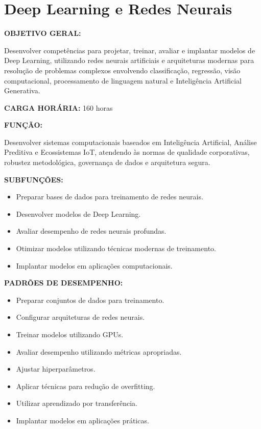 \section{Deep Learning e Redes Neurais}

\textbf{OBJETIVO GERAL:}

Desenvolver competências para projetar, treinar, avaliar e implantar modelos de Deep Learning, utilizando redes neurais artificiais e arquiteturas modernas para resolução de problemas complexos envolvendo classificação, regressão, visão computacional, processamento de linguagem natural e Inteligência Artificial Generativa.

\textbf{CARGA HORÁRIA:} 160 horas

\textbf{FUNÇÃO:}

Desenvolver sistemas computacionais baseados em Inteligência Artificial, Análise Preditiva e Ecossistemas IoT, atendendo às normas de qualidade corporativas, robustez metodológica, governança de dados e arquitetura segura.

\textbf{SUBFUNÇÕES:}

\begin{itemize}
\item Preparar bases de dados para treinamento de redes neurais.
\item Desenvolver modelos de Deep Learning.
\item Avaliar desempenho de redes neurais profundas.
\item Otimizar modelos utilizando técnicas modernas de treinamento.
\item Implantar modelos em aplicações computacionais.
\end{itemize}

\textbf{PADRÕES DE DESEMPENHO:}

\begin{itemize}
\item Preparar conjuntos de dados para treinamento.
\item Configurar arquiteturas de redes neurais.
\item Treinar modelos utilizando GPUs.
\item Avaliar desempenho utilizando métricas apropriadas.
\item Ajustar hiperparâmetros.
\item Aplicar técnicas para redução de overfitting.
\item Utilizar aprendizado por transferência.
\item Implantar modelos em aplicações práticas.
\end{itemize}

